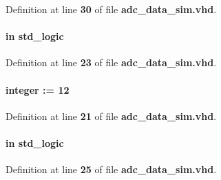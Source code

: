 Definition at line {\bf 30} of file {\bf adc\+\_\+data\+\_\+sim.\+vhd}.

\paragraph[{clk}]{ {\bfseries \textcolor{keywordflow}{in}\textcolor{vhdlchar}{ }} {\bfseries \textcolor{comment}{std\+\_\+logic}\textcolor{vhdlchar}{ }} \hspace{0.3cm}{\ttfamily [Port]}}\label{classadc__data__sim_a4a4609c199d30b3adebbeb3a01276ec5}


Definition at line {\bf 23} of file {\bf adc\+\_\+data\+\_\+sim.\+vhd}.

\paragraph[{data\+\_\+width}]{ {\bfseries \textcolor{vhdlchar}{ }} {\bfseries \textcolor{comment}{integer}\textcolor{vhdlchar}{ }\textcolor{vhdlchar}{ }\textcolor{vhdlchar}{\+:}\textcolor{vhdlchar}{=}\textcolor{vhdlchar}{ }\textcolor{vhdlchar}{ } \textcolor{vhdldigit}{12} \textcolor{vhdlchar}{ }} \hspace{0.3cm}{\ttfamily [Generic]}}\label{classadc__data__sim_a767062193f3a56a69d58d31e9a52f103}


Definition at line {\bf 21} of file {\bf adc\+\_\+data\+\_\+sim.\+vhd}.

\paragraph[{en}]{ {\bfseries \textcolor{keywordflow}{in}\textcolor{vhdlchar}{ }} {\bfseries \textcolor{comment}{std\+\_\+logic}\textcolor{vhdlchar}{ }} \hspace{0.3cm}{\ttfamily [Port]}}\label{classadc__data__sim_adcf9c6f5161d039addbda5819bee64a3}


Definition at line {\bf 25} of file {\bf adc\+\_\+data\+\_\+sim.\+vhd}.

